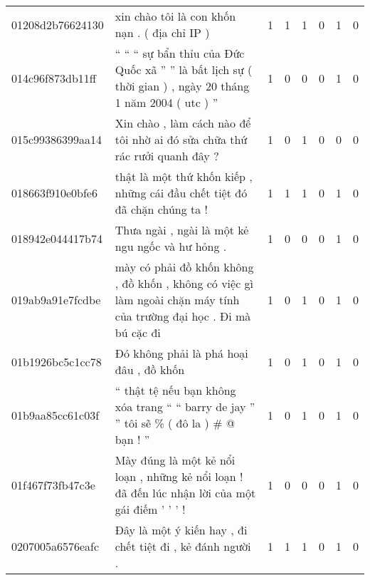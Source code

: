 \begin{center}
\begin{sidewaystable}[htb]
\begin{tabularx}{\textwidth}{L{0.8} L{6.6} C{0.1} C{0.1} C{0.1} C{0.1} C{0.1} C{0.1}}
            01208d2b76624130 & xin chào tôi là con khốn nạn . ( địa chỉ IP )                                                                                     & 1           & 1           & 1           & 0           & 1           & 0           \\
            014c96f873db11ff & `` `` `` sự bẩn thỉu của Đức Quốc xã '' '' là bất lịch sự ( thời gian ) , ngày 20 tháng 1 năm 2004 ( utc ) ''                     & 1           & 0           & 0           & 0           & 1           & 0           \\
            015c99386399aa14 & Xin chào , làm cách nào để tôi nhờ ai đó sửa chữa thứ rác rưởi quanh đây ?                                                        & 1           & 0           & 1           & 0           & 0           & 0           \\
            018663f910e0bfe6 & thật là một thứ khốn kiếp , những cái đầu chết tiệt đó đã chặn chúng ta !                                                         & 1           & 1           & 1           & 0           & 1           & 0           \\
            018942e044417b74 & Thưa ngài , ngài là một kẻ ngu ngốc và hư hỏng .                                                                                  & 1           & 0           & 0           & 0           & 1           & 0           \\
            019ab9a91e7fcdbe & mày có phải đồ khốn không , đồ khốn , không có việc gì làm ngoài chặn máy tính của trường đại học . Đi mà bú cặc đi               & 1           & 0           & 1           & 0           & 1           & 0           \\
            01b1926bc5c1cc78 & Đó không phải là phá hoại đâu , đồ khốn                                                                                           & 1           & 0           & 1           & 0           & 1           & 0           \\
            01b9aa85cc61c03f & `` thật tệ nếu bạn không xóa trang `` `` barry de jay '' '' tôi sẽ \% ( đô la ) \# @ bạn ! ''                                     & 1           & 0           & 1           & 0           & 1           & 0           \\
            01f467f73fb47c3e & Mày đúng là một kẻ nổi loạn , những kẻ nổi loạn ! đã đến lúc nhận lời của một gái điếm ' ' ' !                                    & 1           & 0           & 0           & 0           & 1           & 0           \\
            0207005a6576eafc & Đây là một ý kiến hay , đi chết tiệt đi , kẻ đánh người .                                                                         & 1           & 1           & 1           & 0           & 1           & 0           \\

\end{tabularx}
\end{sidewaystable}
\end{center}
